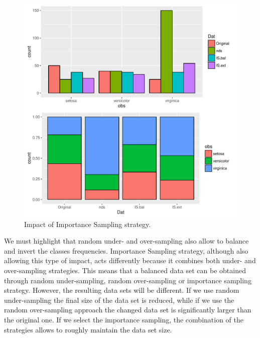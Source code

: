 \documentclass[10pt,a4paper]{article}\usepackage[]{graphicx}\usepackage[]{color}
\makeatletter
\def\maxwidth{ %
  \ifdim\Gin@nat@width>\linewidth
    \linewidth
  \else
    \Gin@nat@width
  \fi
}
\newenvironment{knitrout}{}{} %
\makeatother
\begin{document}
\begin{knitrout}\footnotesize
{}\color{fgcolor}\begin{figure}

{\centering \includegraphics[width=\maxwidth]{figures/UBL-ISC_2-1} 

}

\caption[Impact of Importance Sampling strategy]{Impact of Importance Sampling strategy.}\label{fig:ISC_2}
\end{figure}


\end{knitrout}

We must highlight that random under- and over-sampling also allow to balance and invert the classes frequencies. Importance Sampling strategy, although also allowing this type of impact, acts differently because it combines both under- and over-sampling strategies. This means that a balanced data set can be obtained through random under-sampling, random over-sampling or importance sampling strategy. However, the resulting data sets will be different. If we use random under-sampling the final size of the data set is reduced, while if we use the random over-sampling approach the changed data set is significantly larger than the original one. If we select the importance sampling, the combination of the strategies allows to roughly maintain the data set size.
\end{document}
